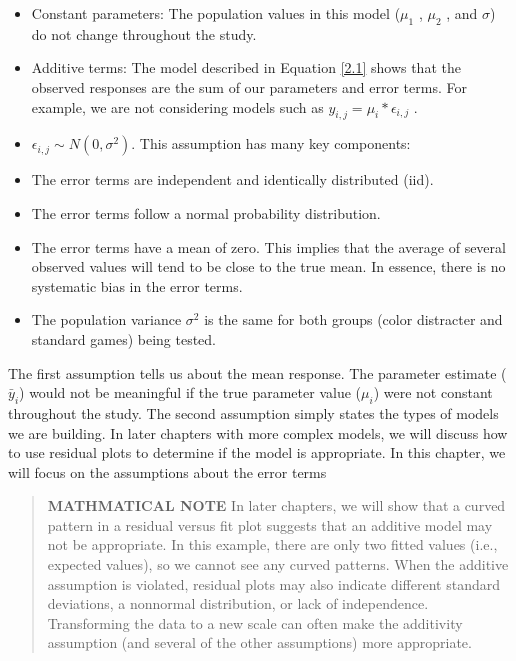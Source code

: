 \documentclass[
]{report}
\providecommand{\tightlist}{%
  \setlength{\itemsep}{0pt}\setlength{\parskip}{0pt}}
\begin{document}
\begin{itemize}
\tightlist
\item
  Constant parameters: The population values in this model (\(\mu_1\) , \(\mu_2\) , and \(\sigma\)) do not change throughout the study.
\item
  Additive terms: The model described in Equation \ref{2.1} shows that the observed responses are the sum of our parameters and error terms. For example, we are not considering models such as
  \(y_{i, j} = \mu_i * \epsilon_{i, j}\) .
\item
  \(\epsilon_{i, j} \sim N(0,\sigma^2)\). This assumption has many key components:
\item
  The error terms are independent and identically distributed (iid).
\item
  The error terms follow a normal probability distribution.
\item
  The error terms have a mean of zero. This implies that the average of several observed values will tend to be close to the true mean. In essence, there is no systematic bias in the error terms.
\item
  The population variance \(\sigma^2\) is the same for both groups (color distracter and standard games) being tested.
\end{itemize}

The first assumption tells us about the mean response. The parameter estimate (\(\bar{y}_i\)) would not be meaningful if the true parameter value (\(\mu_i\)) were not constant throughout the study. The second assumption simply states the types of models we are building. In later chapters with more complex models, we will discuss how to use residual plots to determine if the model is appropriate. In this chapter, we will focus on the assumptions about the error terms

\begin{quote}
\textbf{MATHMATICAL NOTE}
In later chapters, we will show that a curved pattern in a residual versus fit plot suggests that an additive model may not be appropriate. In this example, there are only two fitted values (i.e., expected values), so we cannot see any curved patterns. When the additive assumption is violated, residual plots may also indicate different standard deviations, a nonnormal distribution, or lack of independence. Transforming the data to a new scale can often make the additivity assumption (and several of the other assumptions) more appropriate.
\end{quote}
\end{document}
